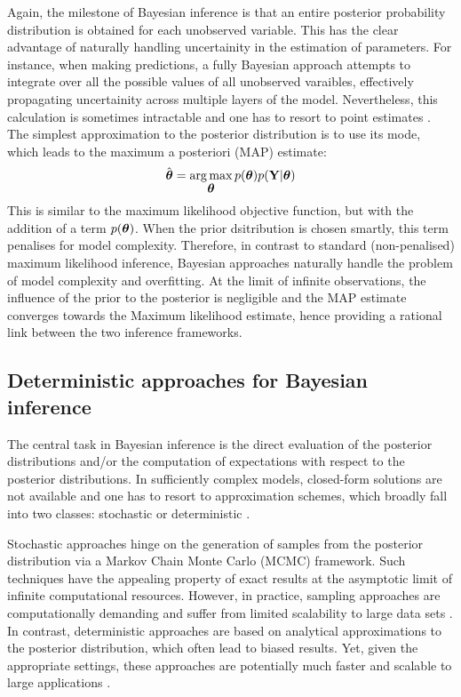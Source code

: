 Again, the milestone of Bayesian inference is that an entire posterior probability distribution is obtained for each unobserved variable. This has the clear advantage of naturally handling uncertainity in the estimation of parameters. For instance, when making predictions, a fully Bayesian approach attempts to integrate over all the possible values of all unobserved varaibles, effectively propagating uncertainity across multiple layers of the model. Nevertheless, this calculation is sometimes intractable and one has to resort to point estimates \cite{Bishop,Murphy,Gelman2013}. The simplest approximation to the posterior distribution is to use its mode, which leads to the maximum a posteriori (MAP) estimate:
\[
	\hat{\mbox{\boldmath $\theta$}} = \operatorname*{arg\,max}_{\mbox{\boldmath $\theta$}} p(\mbox{\boldmath $\theta$}) p({\bf Y}|\mbox{\boldmath $\theta$}) 
\]
This is similar to the maximum likelihood objective function, but with the addition of a term $p(\mbox{\boldmath $\theta$})$. When the prior dsitribution is chosen smartly, this term penalises for model complexity. Therefore, in contrast to standard (non-penalised) maximum likelihood inference, Bayesian approaches naturally handle the problem of model complexity and overfitting\cite{Bishop,Murphy,Gelman2013}. At the limit of infinite observations, the influence of the prior to the posterior is negligible and the MAP estimate converges towards the Maximum likelihood estimate, hence providing a rational link between the two inference frameworks.

\subsection{Deterministic approaches for Bayesian inference} \label{section:deterministic_bayesian_inference}
The central task in Bayesian inference is the direct evaluation of the posterior distributions and/or the computation of expectations with respect to the posterior distributions. In sufficiently complex models, closed-form solutions are not available and one has to resort to approximation schemes, which broadly fall into two classes: stochastic or deterministic \cite{Gelman2013,Blei2016}. 

Stochastic approaches hinge on the generation of samples from the posterior distribution via a Markov Chain Monte Carlo (MCMC) framework. Such techniques have the appealing property of exact results at the asymptotic limit of infinite computational resources. However, in practice, sampling approaches are computationally demanding and suffer from limited scalability to large data sets \cite{Blei2016}.\\
In contrast, deterministic approaches are based on analytical approximations to the posterior distribution, which often lead to biased results. Yet, given the appropriate settings, these approaches are potentially much faster and scalable to large applications \cite{Bishop,Murphy,Blei2016}.

